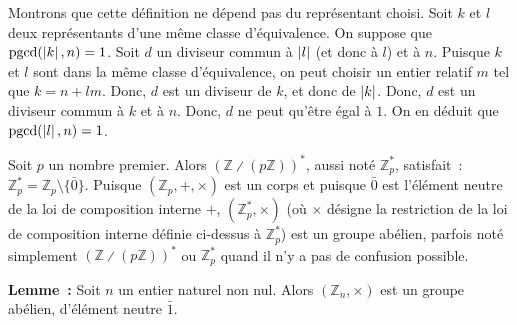Montrons que cette définition ne dépend pas du représentant choisi. 
Soit $k$ et $l$ deux représentants d'une même classe d'équivalence. 
On suppose que $\mathrm{pgcd}(\left\lvert k \right\rvert, n) = 1$.
Soit $d$ un diviseur commun à $\left\lvert l \right\rvert$ (et donc à $l$) et à $n$. 
Puisque $k$ et $l$ sont dans la même classe d'équivalence, on peut choisir un entier relatif $m$ tel que $k = n + l m$.
Donc, $d$ est un diviseur de $k$, et donc de $\left\lvert k \right\rvert$. 
Donc, $d$ est un diviseur commun à $k$ et à $n$. 
Donc, $d$ ne peut qu'être égal à $1$.
On en déduit que $\mathrm{pgcd}(\left\lvert l \right\rvert, n) = 1$.

Soit $p$ un nombre premier. 
Alors $\left( \mathbb{Z} \divslash (p \mathbb{Z}) \right)^*$, aussi noté $\mathbb{Z}_p^*$, satisfait : $\mathbb{Z}_p^* = \mathbb{Z}_p \setminus \lbrace \bar{0} \rbrace$.
Puisque $\left(\mathbb{Z}_p, +, \times \right)$ est un corps et puisque $\bar{0}$ est l'élément neutre de la loi de composition interne $+$, $\left( \mathbb{Z}_p^*, \times \right)$ (où $\times$ désigne la restriction de la loi de composition interne définie ci-dessus à $\mathbb{Z}_p^*$) est un groupe abélien, parfois noté simplement $\left( \mathbb{Z} \divslash (p \mathbb{Z}) \right)^*$ ou $\mathbb{Z}_p^*$ quand il n'y a pas de confusion possible.

\medskip

\noindent
\textbf{Lemme :} Soit $n$ un entier naturel non nul. Alors $\left( \mathbb{Z}_n, \times \right)$ est un groupe abélien, d'élément neutre $\bar{1}$.

\medskip

